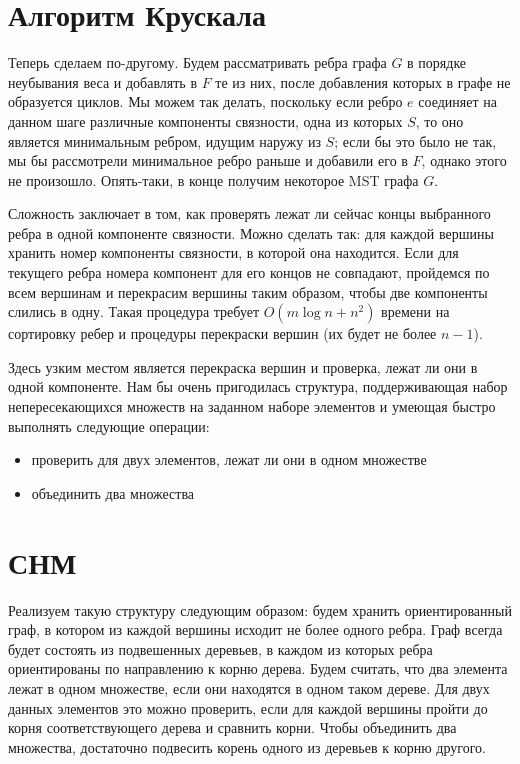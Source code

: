 \documentclass[12pt]{article}
\begin{document}
\section{Алгоритм Крускала}

Теперь сделаем по-другому. Будем рассматривать ребра графа $G$ в порядке неубывания веса и добавлять в $F$ те из них, после добавления которых в графе не образуется циклов. Мы можем так делать, поскольку если ребро $e$ соединяет на данном шаге различные компоненты связности, одна из которых $S$, то оно является минимальным ребром, идущим наружу из $S$; если бы это было не так, мы бы рассмотрели минимальное ребро раньше и добавили его в $F$, однако этого не произошло. Опять-таки, в конце получим некоторое MST графа $G$.

Сложность заключает в том, как проверять лежат ли сейчас концы выбранного ребра в одной компоненте связности. Можно сделать так: для каждой вершины хранить номер компоненты связности, в которой она находится. Если для текущего ребра номера компонент для его концов не совпадают, пройдемся по всем вершинам и перекрасим вершины таким образом, чтобы две компоненты слились в одну. Такая процедура требует $O(m \log n + n^2)$ времени на сортировку ребер и процедуры перекраски вершин (их будет не более $n-1$).

Здесь узким местом является перекраска вершин и проверка, лежат ли они в одной компоненте. Нам бы очень пригодилась структура, поддерживающая набор непересекающихся множеств на заданном наборе элементов и умеющая быстро выполнять следующие операции:

\begin{itemize}

\item проверить для двух элементов, лежат ли они в одном множестве

\item объединить два множества

\end{itemize}

\section{СНМ}

Реализуем такую структуру следующим образом: будем хранить ориентированный граф, в котором из каждой вершины исходит не более одного ребра. Граф всегда будет состоять из подвешенных деревьев, в каждом из которых ребра ориентированы по направлению к корню дерева. Будем считать, что два элемента лежат в одном множестве, если они находятся в одном таком дереве. Для двух данных элементов это можно проверить, если для каждой вершины пройти до корня соответствующего дерева и сравнить корни. Чтобы объединить два множества, достаточно подвесить корень одного из деревьев к корню другого.
\end{document}
